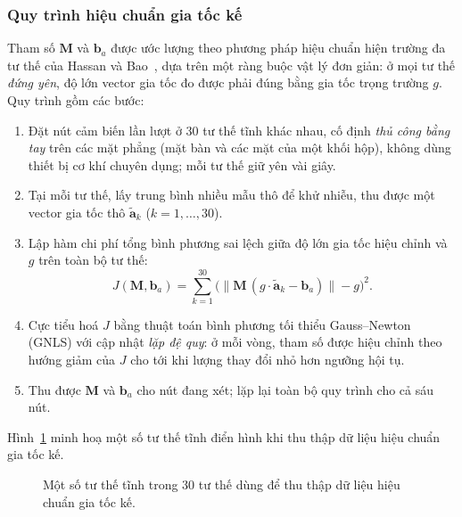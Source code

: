 \documentclass[../DoAn.tex]{subfiles}
\begin{document}
\subsubsection*{Quy trình hiệu chuẩn gia tốc kế}
Tham số $\mathbf{M}$ và $\mathbf{b}_a$ được ước lượng theo phương pháp hiệu chuẩn hiện trường đa tư thế của Hassan và Bao~\cite{hassanbao2020}, dựa trên một ràng buộc vật lý đơn giản: ở mọi tư thế \emph{đứng yên}, độ lớn vector gia tốc đo được phải đúng bằng gia tốc trọng trường $g$. Quy trình gồm các bước:
\begin{enumerate}
    \item Đặt nút cảm biến lần lượt ở $30$ tư thế tĩnh khác nhau, cố định \emph{thủ công bằng tay} trên các mặt phẳng (mặt bàn và các mặt của một khối hộp), không dùng thiết bị cơ khí chuyên dụng; mỗi tư thế giữ yên vài giây.
    \item Tại mỗi tư thế, lấy trung bình nhiều mẫu thô để khử nhiễu, thu được một vector gia tốc thô $\tilde{\mathbf{a}}_k$ ($k = 1,\dots,30$).
    \item Lập hàm chi phí tổng bình phương sai lệch giữa độ lớn gia tốc hiệu chỉnh và $g$ trên toàn bộ tư thế:
          \begin{equation}
              J(\mathbf{M},\mathbf{b}_a) = \sum_{k=1}^{30}\Big( \big\lVert \mathbf{M}\,(g\cdot\tilde{\mathbf{a}}_k - \mathbf{b}_a) \big\rVert - g \Big)^{2}.
              \label{eq:calibcost}
          \end{equation}
    \item Cực tiểu hoá $J$ bằng thuật toán bình phương tối thiểu Gauss--Newton (GNLS) với cập nhật \emph{lặp đệ quy}: ở mỗi vòng, tham số được hiệu chỉnh theo hướng giảm của $J$ cho tới khi lượng thay đổi nhỏ hơn ngưỡng hội tụ.
    \item Thu được $\mathbf{M}$ và $\mathbf{b}_a$ cho nút đang xét; lặp lại toàn bộ quy trình cho cả sáu nút.
\end{enumerate}
Hình~\ref{fig:calib_static} minh hoạ một số tư thế tĩnh điển hình khi thu thập dữ liệu hiệu chuẩn gia tốc kế.

\begin{figure}[H]
    \centering
    \caption{Một số tư thế tĩnh trong $30$ tư thế dùng để thu thập dữ liệu hiệu chuẩn gia tốc kế.}
    \label{fig:calib_static}
\end{figure}
\end{document}
